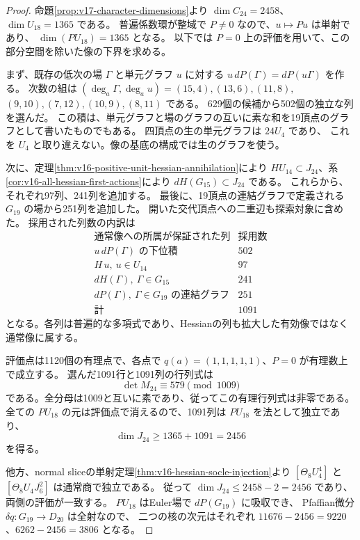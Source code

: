 \begin{proof}
命題\ref{prop:v17-character-dimensions}より
$\dim C_{24}=2458$、$\dim U_{18}=1365$ である。
普遍係数環が整域で $P\neq0$ なので、$u\mapsto Pu$ は単射であり、
$\dim(PU_{18})=1365$ となる。
以下では $P=0$ 上の評価を用いて、この部分空間を除いた像の下界を求める。

まず、既存の低次の場 $\Gamma$ と単元グラフ $u$ に対する
$u\,dP(\Gamma)=dP(u\Gamma)$ を作る。
次数の組は $(\deg_a\Gamma,\deg_a u)=(15,4),(13,6),(11,8),$
$(9,10),(7,12),(10,9),(8,11)$ である。
629個の候補から502個の独立な列を選んだ。
この積は、単元グラフと場のグラフの互いに素な和を19頂点のグラフとして書いたものでもある。
四頂点の生の単元グラフは $24U_4$ であり、
これを $U_4$ と取り違えない。像の基底の構成では生のグラフを使う。

次に、定理\ref{thm:v16-positive-unit-hessian-annihilation}により
$HU_{14}\subset J_{24}$、系\ref{cor:v16-all-hessian-first-actions}により
$dH(G_{15})\subset J_{24}$ である。
これらから、それぞれ97列、241列を追加する。
最後に、19頂点の連結グラフで定義される $G_{19}$ の場から251列を追加した。
開いた交代頂点への二重辺も探索対象に含めた。
採用された列数の内訳は
\[
 \begin{array}{c|r}
 \text{通常像への所属が保証された列}&\text{採用数}\\\hline
 u\,dP(\Gamma)\text{ の下位積}&502\\
 H\,u,\ u\in U_{14}&97\\
 dH(\Gamma),\ \Gamma\in G_{15}&241\\
 dP(\Gamma),\ \Gamma\in G_{19}\text{ の連結グラフ}&251\\\hline
 \text{計}&1091
 \end{array}
\]
となる。各列は普遍的な多項式であり、Hessianの列も拡大した有効像ではなく通常像に属する。

評価点は1120個の有理点で、各点で $q(a)=(1,1,1,1,1)$、$P=0$ が有理数上で成立する。
選んだ1091行と1091列の行列式は
\[
 \det M_{24}\equiv579\pmod{1009}
\]
である。全分母は1009と互いに素であり、従ってこの有理行列式は非零である。
全ての $PU_{18}$ の元は評価点で消えるので、1091列は $PU_{18}$ を法として独立であり、
\[
 \dim J_{24}\ge1365+1091=2456
\]
を得る。

他方、normal sliceの単射定理\ref{thm:v16-hessian-socle-injection}より
$[\Theta_8U_4^4]$ と $[\Theta_8U_4J_6^2]$ は通常商で独立である。
従って $\dim J_{24}\le2458-2=2456$ であり、両側の評価が一致する。
$PU_{18}$ はEuler場で $dP(G_{19})$ に吸収でき、
Pfaffian微分 $\delta q:G_{19}\to D_{20}$ は全射なので、
二つの核の次元はそれぞれ $11676-2456=9220$、$6262-2456=3806$ となる。
\end{proof}

